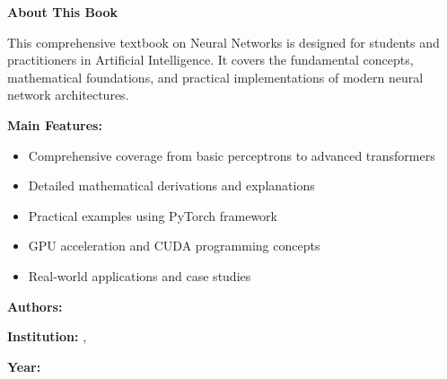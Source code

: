 \newpage
\thispagestyle{empty}

\vspace*{2cm}

\begin{center}
    \Large\textbf{About This Book}
\end{center}

\vspace{1cm}

This comprehensive textbook on Neural Networks is designed for students and practitioners in Artificial Intelligence. It covers the fundamental concepts, mathematical foundations, and practical implementations of modern neural network architectures.

\textbf{Main Features:}
\begin{itemize}
    \item Comprehensive coverage from basic perceptrons to advanced transformers
    \item Detailed mathematical derivations and explanations
    \item Practical examples using PyTorch framework
    \item GPU acceleration and CUDA programming concepts
    \item Real-world applications and case studies
\end{itemize}

\vspace{2cm}

\textbf{Authors:} \thesisAuthor

\textbf{Institution:} \thesisSchool, \thesisDepartment

\textbf{Year:} \thesisYear

\newpage
